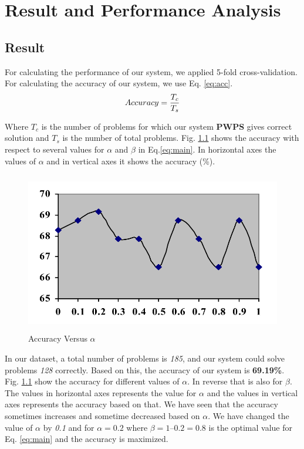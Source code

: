 \documentclass[document.tex]{subfiles}
\begin{document}
\chapter{Result and Performance Analysis}

\section{Result}
\noindent For calculating the performance of our system, we applied 5-fold cross-validation. For calculating the accuracy of our system, we use Eq. \ref{eq:acc}.
\begin{equation}
	Accuracy = {T_c \over T_s}
	\label{eq:acc}
\end{equation}

Where $T_c$ is the number of problems for which our system
\textbf{PWPS} gives correct solution and $T_s$ is the number of total problems. Fig. \ref{fig:accvsalpha} shows the accuracy with respect to several values for $\alpha$ and $\beta$ in Eq.\ref{eq:main}. In horizontal axes the values of $\alpha$ and
in vertical axes it shows the accuracy (\%).

\begin{figure}[H]
	\begin{center}
		\includegraphics[height=7cm]{imgs/Acc.png}
	\end{center}
	\caption{Accuracy Versus $\alpha$}
	\label{fig:accvsalpha}
\end{figure}

In our dataset, a total number of problems is \textit{185}, and our system could solve problems \textit{128} correctly. Based on this, the accuracy of our system is \textbf{69.19\%}. Fig. \ref{fig:accvsalpha} show the accuracy for different values of $\alpha$. In reverse that is also for $\beta$. The values in horizontal axes represents the value for $\alpha$ and the values in vertical axes represents the accuracy based on that. We have seen that the accuracy sometimes increases and sometime decreased based on $\alpha$. We have changed the value of $\alpha$ by \textit{0.1} and for $\alpha=0.2$ where $\beta = 1 – 0.2 = 0.8$ is the optimal value for Eq. \ref{eq:main} and the accuracy is maximized.
\end{document}
